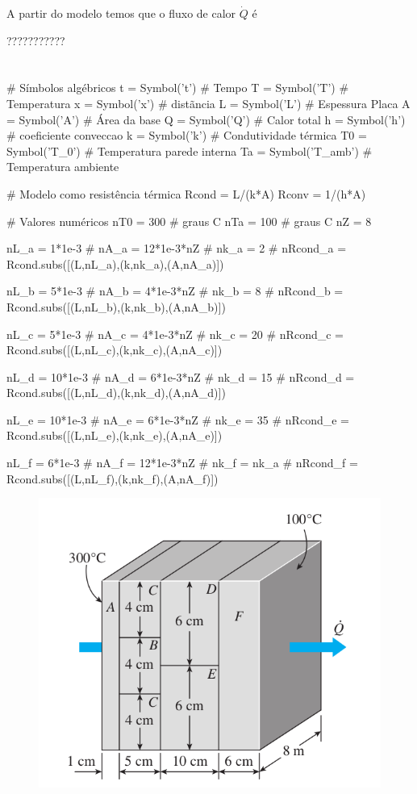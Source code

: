 \documentclass[a4paper,11pt]{article}
\begin{document}

A partir do modelo temos que o fluxo de calor $\dot{Q}$ é


???????????

\section{}

\begin{sympycode}
# Símbolos algébricos
t = Symbol('t') # Tempo
T = Symbol('T') # Temperatura
x = Symbol('x') # distãncia
L = Symbol('L') # Espessura Placa
A = Symbol('A') # Área da base
Q = Symbol('Q') # Calor total
h = Symbol('h') # coeficiente conveccao
k = Symbol('k') # Condutividade térmica
T0 = Symbol('T_0') # Temperatura parede interna
Ta = Symbol('T_amb') # Temperatura ambiente

# Modelo como resistência térmica
Rcond = L/(k*A)
Rconv = 1/(h*A)

# Valores numéricos
nT0 = 300 # graus C
nTa = 100 # graus C
nZ = 8

nL_a = 1*1e-3 #
nA_a = 12*1e-3*nZ #
nk_a = 2 #
nRcond_a = Rcond.subs([(L,nL_a),(k,nk_a),(A,nA_a)])

nL_b = 5*1e-3 #
nA_b = 4*1e-3*nZ #
nk_b = 8 #
nRcond_b = Rcond.subs([(L,nL_b),(k,nk_b),(A,nA_b)])

nL_c = 5*1e-3 #
nA_c = 4*1e-3*nZ #
nk_c = 20 #
nRcond_c = Rcond.subs([(L,nL_c),(k,nk_c),(A,nA_c)])

nL_d = 10*1e-3 #
nA_d = 6*1e-3*nZ #
nk_d = 15 #
nRcond_d = Rcond.subs([(L,nL_d),(k,nk_d),(A,nA_d)])

nL_e = 10*1e-3 #
nA_e = 6*1e-3*nZ #
nk_e = 35 #
nRcond_e = Rcond.subs([(L,nL_e),(k,nk_e),(A,nA_e)])

nL_f = 6*1e-3 #
nA_f = 12*1e-3*nZ #
nk_f = nk_a #
nRcond_f = Rcond.subs([(L,nL_f),(k,nk_f),(A,nA_f)])
\end{sympycode}

\begin{figure}[H]
\centering
\includegraphics[width = 0.6\linewidth]{./image/lista1/q8}
\end{figure}
\end{document}
